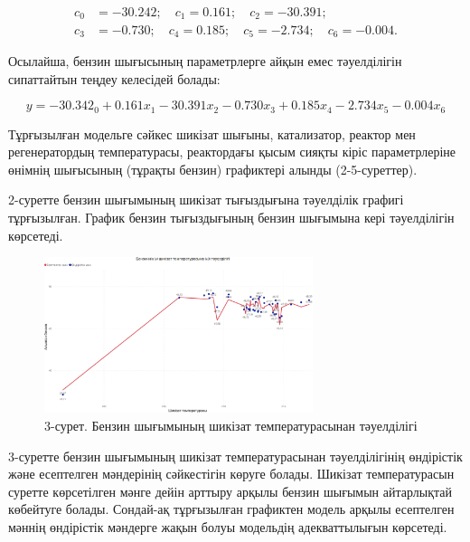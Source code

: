 \begin{equation*}
\begin{aligned}
c_0 &= -30.242; \quad c_1 = 0.161; \quad c_2 = -30.391; \\
c_3 &= -0.730; \quad c_4 = 0.185; \quad c_5 = -2.734; \quad c_6 = -0.004.
\end{aligned}
\end{equation*}

Осылайша, бензин шығысының параметрлерге айқын емес тәуелділігін
сипаттайтын теңдеу келесідей болады:

\begin{equation}
y=-30.342_0+0.161x_1-30.391x_2-0.730x_3+0.185x_4-2.734x_5-0.004x_6
\end{equation}

\begin{multicols}{2}
Тұрғызылған модельге сәйкес шикізат шығыны, катализатор, реактор мен
регенератордың температурасы, реактордағы қысым сияқты кіріс
параметрлеріне өнімнің шығысының (тұрақты бензин) графиктері алынды
(2-5-суреттер).

2-суретте бензин шығымының шикізат тығыздығына тәуелділік графигі
тұрғызылған. График бензин тығыздығының бензин шығымына кері
тәуелділігін көрсетеді.
\end{multicols}

\begin{figure}[H]
	\centering
	\includegraphics[width=0.7\textwidth]{media/ict/image96}
	\caption*{3-сурет. Бензин шығымының шикізат температурасынан тәуелділігі}
\end{figure}

\begin{multicols}{2}
3-суретте бензин шығымының шикізат температурасынан тәуелділігінің
өндірістік және есептелген мәндерінің сәйкестігін көруге болады. Шикізат
температурасын суретте көрсетілген мәнге дейін арттыру арқылы бензин
шығымын айтарлықтай көбейтуге болады. Сондай-ақ тұрғызылған графиктен
модель арқылы есептелген мәннің өндірістік мәндерге жақын болуы
модельдің адекваттылығын көрсетеді.
\end{multicols}

